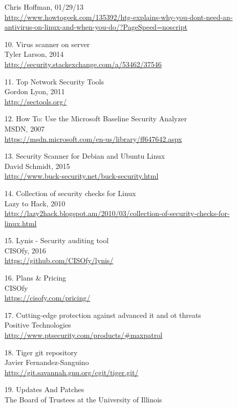 \documentclass[a4paper,12pt]{article}
\begin{document}
\begin{sloppypar}
\begin{enumerate}
	Chris Hoffman, 01/29/13 \\
	\url{http://www.howtogeek.com/135392/htg-explains-why-you-dont-need-an-antivirus-on-linux-and-when-you-do/?PageSpeed=noscript}
\item [10.] Virus scanner on server \\ 
	Tyler Larson, 2014\\
	\url{http://security.stackexchange.com/a/53462/37546}
\item [11.] Top Network Security Tools \\ 
	Gordon Lyon, 2011 \\
	\url{http://sectools.org/}
\item [12.] How To: Use the Microsoft Baseline Security Analyzer \\ 
	MSDN, 2007 \\
	\url{https://msdn.microsoft.com/en-us/library/ff647642.aspx}
\item [13.] Security Scanner for Debian and Ubuntu Linux \\ 
	David Schmidt, 2015 \\
	\url{http://www.buck-security.net/buck-security.html}
\item [14.] Collection of security checks for Linux \\ 
	Lazy to Hack, 2010 \\
	\url{http://lazy2hack.blogspot.am/2010/03/collection-of-security-checks-for-linux.html}
\item [15.]  Lynis - Security auditing tool \\ 
	CISOfy, 2016 \\
	\url{https://github.com/CISOfy/lynis/}
\item [16.] Plans \& Pricing \\ 
	CISOfy \\
	\url{https://cisofy.com/pricing/}
\item [17.] Cutting-edge protection against advanced it and ot threats \\ 
	Positive Technologies \\
	\url{http://www.ptsecurity.com/products/#maxpatrol}
\item [18.] Tiger git repository \\ 
	Javier Fernandez-Sanguino \\
	\url{http://git.savannah.gnu.org/cgit/tiger.git/}
\item [19.] Updates And Patches \\ 
	The Board of Trustees at the University of Illinois \\

\end{enumerate}
\end{sloppypar}
\end{document}
